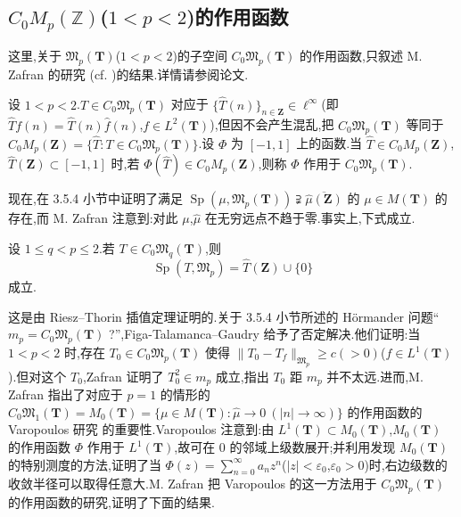 \subsection{\texorpdfstring{$C_0 M_p(\mathbb{Z})$($1<p<2$)的作用函数}{C0 M_p(Z)(1<p<2)的作用函数}}\label{sec:3.5.6}

这里,关于 $\mathfrak{M}_{p}(\mathbf{T})$($1 < p < 2$)的子空间 $C_{0}\mathfrak{M}_{p}(\mathbf{T})$ 的作用函数,只叙述 M. Zafran 的研究 \cite{ch3:59}(cf. \cite{ch3:58})的结果.详情请参阅论文.

\begin{definition}\label{def:3.5.35}
设 $1 < p < 2$.$T \in C_{0}\mathfrak{M}_{p}(\mathbf{T})$ 对应于 $\{\widehat{T}(n)\}_{n \in \mathbf{Z}} \in \ell^{\infty}$(即 $\widehat{T}f(n) = \widehat{T}(n)\widehat{f}(n)$,$f \in L^{2}(\mathbf{T})$),但因不会产生混乱,把 $C_{0}\mathfrak{M}_{p}(\mathbf{T})$ 等同于 $C_{0}M_{p}(\mathbf{Z}) = \{\widehat{T}: T \in C_{0}\mathfrak{M}_{p}(\mathbf{T})\}$.设 $\Phi$ 为 $[-1, 1]$ 上的函数.当 $\widehat{T} \in C_{0}M_{p}(\mathbf{Z})$,$\widehat{T}(\mathbf{Z}) \subset [-1, 1]$ 时,若 $\Phi(\widehat{T}) \in C_{0}M_{p}(\mathbf{Z})$,则称 $\Phi$ 作用于 $C_{0}\mathfrak{M}_{p}(\mathbf{T})$.
\end{definition}

现在,在 3.5.4 小节中证明了满足 $\operatorname{Sp}(\mu, \mathfrak{M}_p(\mathbf{T})) \supsetneqq \overline{\widehat{\mu}(\mathbf{Z})}$ 的 $\mu \in M(\mathbf{T})$ 的存在,而 M. Zafran 注意到:对此 $\mu$,$\hat{\mu}$ 在无穷远点不趋于零.事实上,下式成立.

\begin{theorem}[{$\;$\cite{ch3:22}}]\label{thm:3.5.36}
设 $1 \leq q < p \leq 2$.若 $T \in C_{0}\mathfrak{M}_{q}(\mathbf{T})$,则
\begin{equation*}
\operatorname{Sp}(T, \mathfrak{M}_{p}) = \hat{T}(\mathbf{Z}) \cup \{0\}
\end{equation*}
成立.
\end{theorem}

这是由 Riesz--Thorin 插值定理证明的.关于 3.5.4 小节所述的 Hörmander 问题``$m_p = C_0\mathfrak{M}_p(\mathbf{T})$ ?'',Figa-Talamanca--Gaudry \cite{ch3:18} 给予了否定解决.他们证明:当 $1 < p < 2$ 时,存在 $T_0 \in C_0\mathfrak{M}_p(\mathbf{T})$ 使得 $\|T_0 - T_f\|_{\mathfrak{M}_p} \geq c(>0)$($f \in L^1(\mathbf{T})$).但对这个 $T_0$,Zafran \cite{ch3:57} 证明了 $T_0^2 \in m_p$ 成立,指出 $T_0$ 距 $m_p$ 并不太远.进而,M. Zafran 指出了对应于 $p = 1$ 的情形的 $C_0\mathfrak{M}_1(\mathbf{T}) = M_0(\mathbf{T}) = \{\mu \in M(\mathbf{T}): \hat{\mu} \to 0 \ (|n| \to \infty)\}$ 的作用函数的 Varopoulos 研究 \cite{ch3:51} 的重要性.Varopoulos \cite{ch3:51} 注意到:由 $L^1(\mathbf{T}) \subset M_0(\mathbf{T})$,$M_0(\mathbf{T})$ 的作用函数 $\Phi$ 作用于 $L^1(\mathbf{T})$,故可在 0 的邻域上级数展开;并利用发现 $M_0(\mathbf{T})$ 的特别测度的方法,证明了当 $\Phi(z) = \sum_{n=0}^{\infty}a_nz^n$($|z| < \varepsilon_0$,$\varepsilon_0 > 0$)时,右边级数的收敛半径可以取得任意大.M. Zafran 把 Varopoulos \cite{ch3:51} 的这一方法用于 $C_0\mathfrak{M}_p(\mathbf{T})$ 的作用函数的研究,证明了下面的结果.

